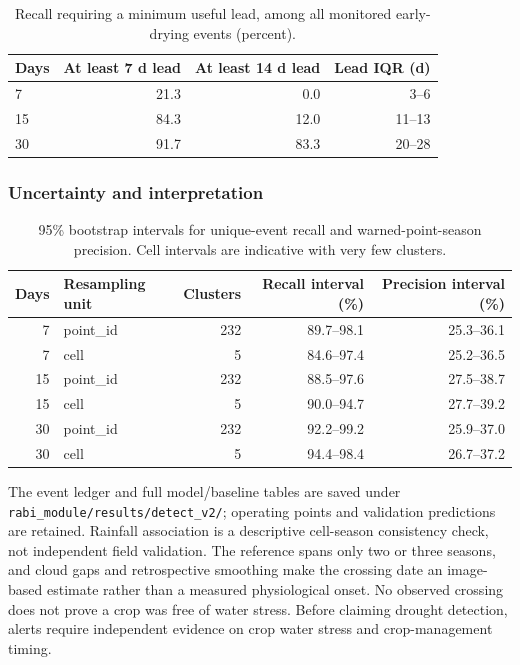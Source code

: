 \begin{table}[H]
\centering
\footnotesize
\caption{Recall requiring a minimum useful lead, among all monitored early-drying events (percent).}
\label{tab:r_useful_lead}
\begin{tabularx}{\textwidth}{@{}Xrrr@{}}
\toprule
\textbf{Days} & \textbf{At least 7 d lead} & \textbf{At least 14 d lead} & \textbf{Lead IQR (d)} \\
\midrule
7 & 21.3 & 0.0 & 3--6 \\
15 & 84.3 & 12.0 & 11--13 \\
30 & 91.7 & 83.3 & 20--28 \\
\bottomrule
\end{tabularx}
\end{table}


\subsubsection{Uncertainty and interpretation}

\begin{table}[H]
\centering
\footnotesize
\caption{95\% bootstrap intervals for unique-event recall and warned-point-season precision. Cell intervals are indicative with very few clusters.}
\label{tab:r_event_ci}
\begin{tabularx}{\textwidth}{@{}rXrrr@{}}
\toprule
\textbf{Days} & \textbf{Resampling unit} & \textbf{Clusters} & \textbf{Recall interval (\%)} & \textbf{Precision interval (\%)} \\
\midrule
7 & point\_id & 232 & 89.7--98.1 & 25.3--36.1 \\
7 & cell & 5 & 84.6--97.4 & 25.2--36.5 \\
15 & point\_id & 232 & 88.5--97.6 & 27.5--38.7 \\
15 & cell & 5 & 90.0--94.7 & 27.7--39.2 \\
30 & point\_id & 232 & 92.2--99.2 & 25.9--37.0 \\
30 & cell & 5 & 94.4--98.4 & 26.7--37.2 \\
\bottomrule
\end{tabularx}
\end{table}


The event ledger and full model/baseline tables are saved under \texttt{rabi\_module/results/detect\_v2/}; operating points and validation predictions are retained. Rainfall association is a descriptive cell-season consistency check, not independent field validation. The reference spans only two or three seasons, and cloud gaps and retrospective smoothing make the crossing date an image-based estimate rather than a measured physiological onset. No observed crossing does not prove a crop was free of water stress. Before claiming drought detection, alerts require independent evidence on crop water stress and crop-management timing.




